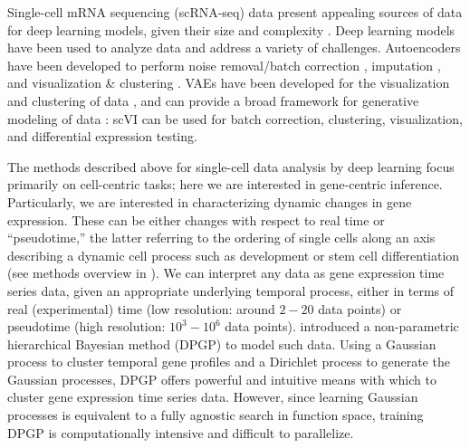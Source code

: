 \par 
Single-cell mRNA sequencing (scRNA-seq) data present appealing sources of data for deep learning models, given their size and complexity \citep{svensson2018exponential}. Deep learning models have been used to analyze \scrna data and address a variety of challenges. Autoencoders have been developed to perform noise removal/batch correction \citep{deng2019scalable, eraslan2019single, wang2019data}, imputation \citep{talwar2018autoimpute}, and visualization \& clustering \citep{lin2017using}. VAEs have been developed for the visualization and clustering of \scrna data \citep{ding2018interpretable, wang2018vasc}, and can provide a broad framework for generative modeling of \scrna data \citep{lopez2018deep}: scVI can be used for batch correction, clustering, visualization, and differential expression testing.
\par 
The methods described above for single-cell data analysis by deep learning focus primarily on cell-centric tasks; here we are interested in gene-centric inference. Particularly, we are interested in characterizing dynamic changes in gene expression. These can be either changes with respect to real time or ``pseudotime,'' the latter referring to the ordering of single cells along an axis describing a dynamic cell process such as development or stem cell differentiation (see methods overview in \citep{saelens2019comparison}). We can interpret any \scrna data as gene expression time series data, given an appropriate underlying temporal process, either in terms of real (experimental) time (low resolution: around $2-20$ data points) or pseudotime (high resolution: $10^3-10^6$ data points). \citet{McDowell2018} introduced a non-parametric hierarchical Bayesian method (DPGP) to model such data. Using a Gaussian process to cluster temporal gene profiles and a Dirichlet process to generate the Gaussian processes, DPGP offers powerful and intuitive means with which to cluster gene expression time series data. However, since learning Gaussian processes is equivalent to a fully agnostic search in function space, training DPGP is computationally intensive and difficult to parallelize.  
